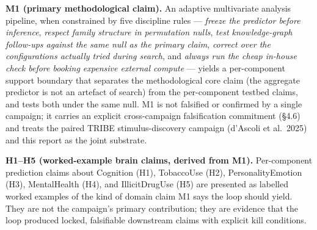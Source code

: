 \documentclass[11pt,letterpaper]{report}
\begin{document}
\textbf{M1 (primary methodological claim).} An adaptive multivariate analysis pipeline, when constrained by five discipline rules --- \emph{freeze the predictor before inference}, \emph{respect family structure in permutation nulls}, \emph{test knowledge-graph follow-ups against the same null as the primary claim}, \emph{correct over the configurations actually tried during search}, and \emph{always run the cheap in-house check before booking expensive external compute} --- yields a per-component support boundary that separates the methodological core claim (the aggregate predictor is not an artefact of search) from the per-component testbed claims, and tests both under the same null. M1 is not falsified or confirmed by a single campaign; it carries an explicit cross-campaign falsification commitment (\S4.6) and treats the paired TRIBE stimulus-discovery campaign (d'Ascoli et al.\ 2025) and this report as the joint substrate.

\textbf{H1--H5 (worked-example brain claims, derived from M1).} Per-component prediction claims about Cognition (H1), TobaccoUse (H2), PersonalityEmotion (H3), MentalHealth (H4), and IllicitDrugUse (H5) are presented as labelled worked examples of the kind of domain claim M1 says the loop should yield. They are not the campaign's primary contribution; they are evidence that the loop produced locked, falsifiable downstream claims with explicit kill conditions.
\end{document}
